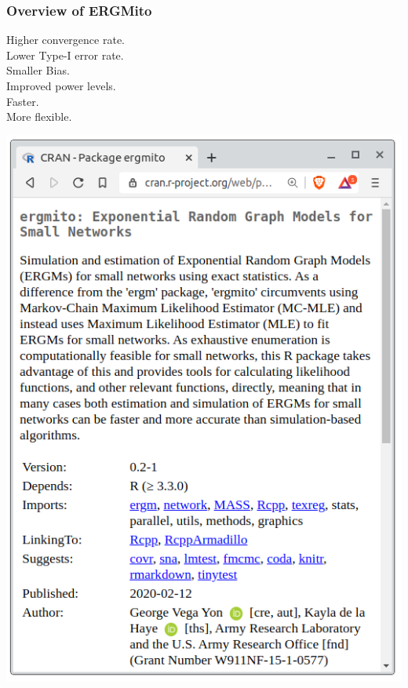 \documentclass[aspectratio=169, 9pt, handout]{beamer}
\begin{document}
% 
% 
% 

\begin{frame}[c,label=ergmito-checklist]
\frametitle{Overview of ERGMito}
\begin{minipage}[m]{.28\linewidth}
	 Higher convergence rate.\\
	 Lower Type-I error rate.\\
	 Smaller Bias.\\
	 Improved power levels.\\
	 Faster.\\
	 More flexible.
\end{minipage}
\hfill
\begin{minipage}[m]{.34\linewidth}
	\centering
	\includegraphics[width=.99\linewidth]{ergmito-page-cran.png}

\end{minipage}
\end{frame}
\end{document}
